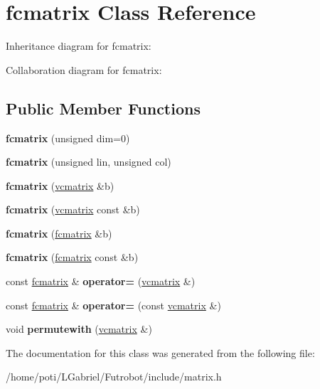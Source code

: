 \hypertarget{classfcmatrix}{}\section{fcmatrix Class Reference}
\label{classfcmatrix}


Inheritance diagram for fcmatrix\+:


Collaboration diagram for fcmatrix\+:
\subsection*{Public Member Functions}
\begin{DoxyCompactItemize}
\item 
{\bfseries fcmatrix} (unsigned dim=0)\hypertarget{classfcmatrix_aece9ada7e26a020627263e3a2ccd9361}{}\label{classfcmatrix_aece9ada7e26a020627263e3a2ccd9361}

\item 
{\bfseries fcmatrix} (unsigned lin, unsigned col)\hypertarget{classfcmatrix_a3dc7da20046cb787d3f5d507bd17bce9}{}\label{classfcmatrix_a3dc7da20046cb787d3f5d507bd17bce9}

\item 
{\bfseries fcmatrix} (\hyperlink{classvcmatrix}{vcmatrix} \&b)\hypertarget{classfcmatrix_a8d198a0294d396856b2f8f66aff65f1e}{}\label{classfcmatrix_a8d198a0294d396856b2f8f66aff65f1e}

\item 
{\bfseries fcmatrix} (\hyperlink{classvcmatrix}{vcmatrix} const \&b)\hypertarget{classfcmatrix_ae0d9628a8ac7b87eedc0586131011f62}{}\label{classfcmatrix_ae0d9628a8ac7b87eedc0586131011f62}

\item 
{\bfseries fcmatrix} (\hyperlink{classfcmatrix}{fcmatrix} \&b)\hypertarget{classfcmatrix_a4595c3d9a7969b05b7d77497c9ccb839}{}\label{classfcmatrix_a4595c3d9a7969b05b7d77497c9ccb839}

\item 
{\bfseries fcmatrix} (\hyperlink{classfcmatrix}{fcmatrix} const \&b)\hypertarget{classfcmatrix_a61eb82a0674cb7b96a3fa39f842c0d2c}{}\label{classfcmatrix_a61eb82a0674cb7b96a3fa39f842c0d2c}

\item 
const \hyperlink{classfcmatrix}{fcmatrix} \& {\bfseries operator=} (\hyperlink{classvcmatrix}{vcmatrix} \&)\hypertarget{classfcmatrix_ab25ddc6d3d5c5eacb5c62842538b3596}{}\label{classfcmatrix_ab25ddc6d3d5c5eacb5c62842538b3596}

\item 
const \hyperlink{classfcmatrix}{fcmatrix} \& {\bfseries operator=} (const \hyperlink{classvcmatrix}{vcmatrix} \&)\hypertarget{classfcmatrix_ac3c5aa4ee257f49b72c4d3a61082eec8}{}\label{classfcmatrix_ac3c5aa4ee257f49b72c4d3a61082eec8}

\item 
void {\bfseries permutewith} (\hyperlink{classvcmatrix}{vcmatrix} \&)\hypertarget{classfcmatrix_a089bb04a847364c8a285a604cb746c3e}{}\label{classfcmatrix_a089bb04a847364c8a285a604cb746c3e}

\end{DoxyCompactItemize}


The documentation for this class was generated from the following file\+:\begin{DoxyCompactItemize}
\item 
/home/poti/\+L\+Gabriel/\+Futrobot/include/matrix.\+h\end{DoxyCompactItemize}
